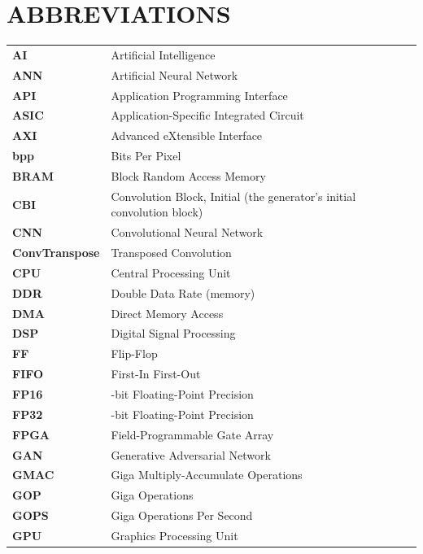\section*{ABBREVIATIONS}

{\small
\setlength{\LTleft}{0pt plus 1fill}
\setlength{\LTright}{0pt plus 1fill}
\renewcommand{\arraystretch}{1.05}
\begin{longtable}{>{\raggedright\arraybackslash}p{} >{\raggedright\arraybackslash}p{}}
\textbf{AI} & Artificial Intelligence \\
\textbf{ANN} & Artificial Neural Network \\
\textbf{API} & Application Programming Interface \\
\textbf{ASIC} & Application-Specific Integrated Circuit \\
\textbf{AXI} & Advanced eXtensible Interface \\
\textbf{bpp} & Bits Per Pixel \\
\textbf{BRAM} & Block Random Access Memory \\
\textbf{CBI} & Convolution Block, Initial (the generator's initial convolution block) \\
\textbf{CNN} & Convolutional Neural Network \\
\textbf{ConvTranspose} & Transposed Convolution \\
\textbf{CPU} & Central Processing Unit \\
\textbf{DDR} & Double Data Rate (memory) \\
\textbf{DMA} & Direct Memory Access \\
\textbf{DSP} & Digital Signal Processing \\
\textbf{FF} & Flip-Flop \\
\textbf{FIFO} & First-In First-Out \\
\textbf{FP16} & 16-bit Floating-Point Precision \\
\textbf{FP32} & 32-bit Floating-Point Precision \\
\textbf{FPGA} & Field-Programmable Gate Array \\
\textbf{GAN} & Generative Adversarial Network \\
\textbf{GMAC} & Giga Multiply-Accumulate Operations \\
\textbf{GOP} & Giga Operations \\
\textbf{GOPS} & Giga Operations Per Second \\
\textbf{GPU} & Graphics Processing Unit \\

\end{longtable}}
